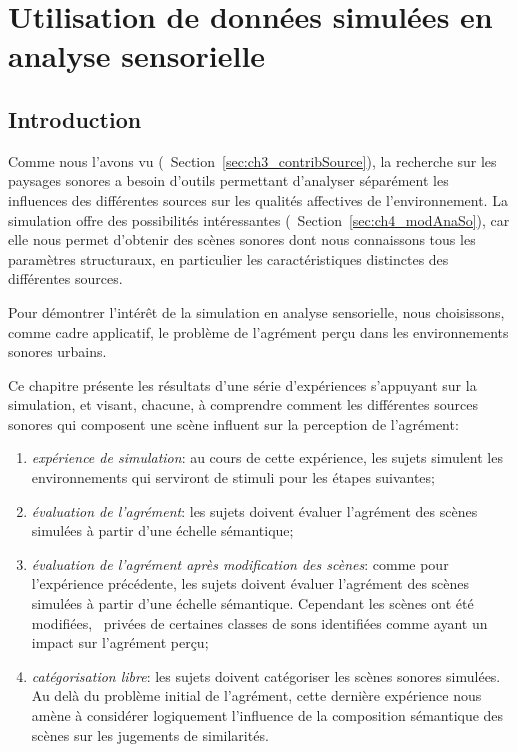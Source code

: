 \chapter[Données simulées et analyse sensorielle]{Utilisation de données simulées en analyse sensorielle}\label{ch:psycho_xp}

\section{Introduction}

Comme nous l'avons vu (\cf~Section~\ref{sec:ch3_contribSource}), la recherche sur les paysages sonores a besoin d'outils permettant d'analyser séparément les influences des différentes sources sur les qualités affectives de l'environnement. La simulation offre des possibilités intéressantes (\cf~Section~\ref{sec:ch4_modAnaSo}), car elle nous permet d'obtenir des scènes sonores dont nous connaissons tous les paramètres structuraux, en particulier les caractéristiques distinctes des différentes sources. 
 
Pour démontrer l'intérêt de la simulation en analyse sensorielle, nous choisissons, comme cadre applicatif, le problème de l'agrément perçu dans les environnements sonores urbains. 

Ce chapitre présente les résultats d'une série d'expériences s'appuyant sur la simulation, et visant, chacune, à comprendre comment les différentes sources sonores qui composent une scène influent sur la perception de l'agrément:

\begin{enumerate}
\item \emph{expérience de simulation}: au cours de cette expérience, les sujets simulent les environnements qui serviront de stimuli pour les étapes suivantes;
\item \emph{évaluation de l'agrément}: les sujets doivent évaluer l'agrément des scènes simulées à partir d'une échelle sémantique;
\item \emph{évaluation de l'agrément après modification des scènes}: comme pour l'expérience précédente, les sujets doivent évaluer l'agrément des scènes simulées à partir d'une échelle sémantique. Cependant les scènes ont été modifiées, \ie~privées de certaines classes de sons identifiées comme ayant un impact sur l'agrément perçu; 
\item \emph{catégorisation libre}: les sujets doivent catégoriser les scènes sonores simulées. Au delà du problème initial de l'agrément, cette dernière expérience nous amène à considérer logiquement l'influence de la composition sémantique des scènes sur les jugements de similarités.
\end{enumerate}

